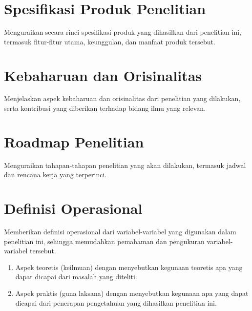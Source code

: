 \section{Spesifikasi Produk Penelitian}
Menguraikan secara rinci spesifikasi produk yang dihasilkan dari penelitian ini, termasuk fitur-fitur utama, keunggulan, dan manfaat produk tersebut.

\section{Kebaharuan dan Orisinalitas}
Menjelaskan aspek kebaharuan dan orisinalitas dari penelitian yang dilakukan, serta kontribusi yang diberikan terhadap bidang ilmu yang relevan.

\section{Roadmap Penelitian}
Menguraikan tahapan-tahapan penelitian yang akan dilakukan, termasuk jadwal dan rencana kerja yang terperinci.

\section{Definisi Operasional}
Memberikan definisi operasional dari variabel-variabel yang digunakan dalam penelitian ini, sehingga memudahkan pemahaman dan pengukuran variabel-variabel tersebut.
\begin{enumerate}
    \item Aspek teoretis (keilmuan) dengan menyebutkan kegunaan teoretis apa yang dapat dicapai dari masalah yang diteliti. 
    \item Aspek praktis (guna laksana) dengan menyebutkan kegunaan apa yang dapat dicapai dari penerapan pengetahuan yang dihasilkan penelitian ini.
\end{enumerate}